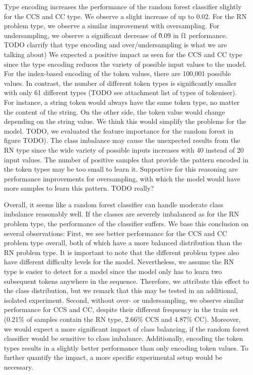 Type encoding increases the performance of the random forest classifier slightly for the CCS and CC type. We observe a slight increase of up to 0.02. For the RN problem type, we observe a similar improvement with oversampling. For undersampling, we observe a significant decrease of \~0.09 in f1 performance. TODO clarrify that type encoding and over/undersampling is what we are talking about)
We expected a positive impact as seen for the CCS and CC type since the type encoding reduces the variety of possible input values to the model. For the index-based encoding of the token values, there are 100,001 possible values. In contrast, the number of different token types is significantly smaller with only 61 different types (TODO see attachment list of types of tokeniser). For instance, a string token would always have the same token type, no matter the content of the string. On the other side, the token value would change depending on the string value. We think this would simplify the problems for the model. TODO, we evaluated the feature importance for the random forest in figure TODO).
The class imbalance may cause the unexpected results from the RN type since the wide variety of possible inputs increases with 40 instead of 20 input values. The number of positive samples that provide the pattern encoded in the token types may be too small to learn it. Supportive for this reasoning are performance improvements for oversampling, with which the model would have more samples to learn this pattern. TODO really?


Overall, it seems like a random forest classifier can handle moderate class imbalance reasonably well. If the classes are severely imbalanced as for the RN problem type, the performance of the classifier suffers.
We base this conclusion on several observations: First, we see better performance for the CCS and CC problem type overall, both of which have a more balanced distribution than the RN problem type. It is important to note that the different problem types also have different difficulty levels for the model. Nevertheless, we assume the RN type is easier to detect for a model since the model only has to learn two subsequent tokens anywhere in the sequence. Therefore, we attribute this effect to the class distribution, but we remark that this may be tested in an additional, isolated experiment. 
Second, without over- or undersampling, we observe similar performance for CCS and CC, despite their different frequency in the train set (0.21\% of samples contain the RN type, 2.66\% CCS and 4.87\% CC). 
Moreover, we would expect a more significant impact of class balancing, if the random forest classifier would be sensitive to class imbalance.
Additionally, encoding the token types results in a slightly better performance than only encoding token values. To further quantify the impact, a more specific experimental setup would be necessary.

